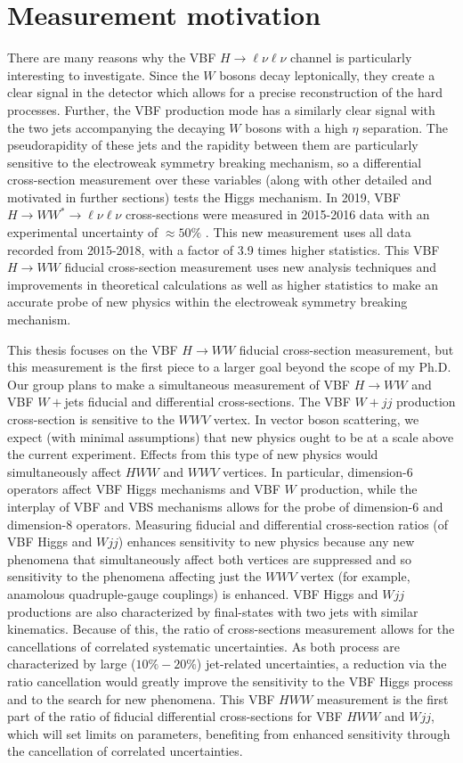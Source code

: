 \section{Measurement motivation}
There are many reasons why the VBF $H\rightarrow\ell\nu\ell\nu$ channel is particularly interesting to investigate. Since the $W$ bosons decay leptonically, they create a clear signal in the detector which allows for a precise reconstruction of the hard processes. Further, the VBF production mode has a similarly clear signal with the two jets accompanying the decaying $W$ bosons with a high $\eta$ separation. The pseudorapidity of these jets and the rapidity between them are particularly sensitive to the electroweak symmetry breaking mechanism, so a differential cross-section measurement over these variables (along with other detailed and motivated in further sections) tests the Higgs mechanism. In 2019, VBF $H\rightarrow WW^* \rightarrow \ell\nu\ell\nu$ cross-sections were measured in 2015-2016 data with an experimental uncertainty of $\approx50\%$ \cite{Aaboud_2019}. This new measurement uses all data recorded from 2015-2018, with a factor of 3.9 times higher statistics. This VBF $H\rightarrow WW$ fiducial cross-section measurement uses new analysis techniques and improvements in theoretical calculations as well as higher statistics to make an accurate probe of new physics within the electroweak symmetry breaking mechanism.

This thesis focuses on the VBF $H\rightarrow WW$ fiducial cross-section measurement, but this measurement is the first piece to a larger goal beyond the scope of my Ph.D. Our group plans to make a simultaneous measurement of VBF $H\rightarrow WW$ and VBF $W+$jets fiducial and differential cross-sections. The VBF $W+jj$ production cross-section is sensitive to the $WWV$ vertex. In vector boson scattering, we expect (with minimal assumptions) that new physics ought to be at a scale above the current experiment. Effects from this type of new physics would simultaneously affect $HWW$ and $WWV$ vertices. In particular, dimension-6 operators affect VBF Higgs mechanisms and VBF $W$ production, while the interplay of VBF and VBS mechanisms allows for the probe of dimension-6 and dimension-8 operators. Measuring fiducial and differential cross-section ratios (of VBF Higgs and $Wjj$) enhances sensitivity to new physics because any new phenomena that simultaneously affect both vertices are suppressed and so sensitivity to the phenomena affecting just the $WWV$ vertex (for example, anamolous quadruple-gauge couplings) is enhanced.  VBF Higgs and $Wjj$ productions are also characterized by final-states with two jets with similar kinematics. Because of this, the ratio of cross-sections measurement allows for the cancellations of correlated systematic uncertainties. As both process are characterized by large ($10\%-20\%$) jet-related uncertainties, a reduction via the ratio cancellation would greatly improve the sensitivity to the VBF Higgs process and to the search for new phenomena. This VBF $HWW$ measurement is the first part of the ratio of fiducial differential cross-sections for VBF $HWW$ and $Wjj$, which will set limits on parameters, benefiting from enhanced sensitivity through the cancellation of correlated uncertainties. 
